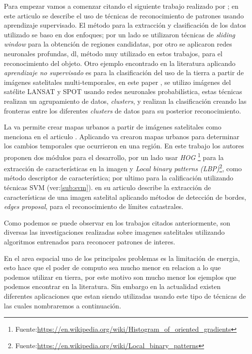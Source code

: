 Para empezar vamos a comenzar citando el siguiente trabajo realizado por \citep{Cheang}; en este articulo se describe el uso de técnicas de reconocimiento de patrones usando aprendizaje supervisado. El método para la extracción y clasificación de los datos utilizado se baso en dos enfoques; por un lado se utilizaron técnicas de \textit{sliding window} para la obtención de regiones candidatas, por otro se aplicaron redes neuronales profundas, \ac{dl}, método muy utilizado en estos trabajos, para el reconocimiento del objeto. Otro ejemplo encontrado en la literatura aplicando  \textit{aprendizaje no supervisado} es para la clasificación del uso de la tierra a partir de imágenes satelitales multi-temporales, en este paper \citep{pnn}, se utilizo imágenes del satélite LANSAT y SPOT usando redes neuronales probabilística, estas técnicas realizan un agrupamiento de datos, \textit{clusters}, y realizan la clasificación creando las fronteras entre los diferentes \textit{clusters} de datos para su posterior reconocimiento.

La \ac{va} permite crear mapas urbanos a partir de imágenes satelitales como menciona en el articulo \citep{detectionHOG}. Aplicando \ac{va} crearon mapas urbanos para determinar los cambios temporales que ocurrieron en una región. En este trabajo los autores proponen dos módulos para el desarrollo, por un lado usar \textit{HOG} \footnote{Fuente:\url{https://en.wikipedia.org/wiki/Histogram_of_oriented_gradients}} para la extracción de características en la imagen y \textit{Local binary patterns (LBP)}\footnote{Fuente:\url{https://en.wikipedia.org/wiki/Local_binary_patterns}}, como método descriptor de característica; por ultimo para la calificación utilizando técnicas SVM (ver:\ref{sub:svm}). \cite{usman} en su articulo describe la extracción de características de una imagen satelital aplicando métodos de  detección de bordes, \textit{edges proposal}, para el 
reconocimiento de límites catastrales.

Como podemos se puede observar en los trabajos citados anteriormente, son diversas las investigaciones realizadas sobre imagenes satelitales utilizando algoritmos entrenados para reconocer patrones de interes. 

En el area espacial uno de los principales problemas es la limitación de energia, esto hace que el poder de computo sea mucho menor en relacion a lo que podemos utilizar en tierra, por este motivo son mucho menor los ejemplos que podemos encontrar en la literatura. Sin embargo en la actualidad existen diferentes aplicaciones que estan siendo utilizadas usando este tipo de técnicas de las cuales nombraremos a continuación.

